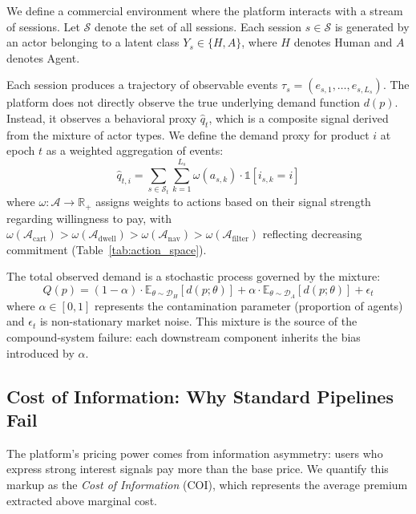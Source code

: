 \documentclass[sigconf]{acmart}
\begin{document}
We define a commercial environment where the platform interacts with a stream of sessions. Let $\mathcal{S}$ denote the set of all sessions. Each session $s \in \mathcal{S}$ is generated by an actor belonging to a latent class $Y_s \in \{H, A\}$, where $H$ denotes Human and $A$ denotes Agent.

Each session produces a trajectory of observable events $\tau_s = (e_{s,1}, \ldots, e_{s,L_s})$. The platform does not directly observe the true underlying demand function $d(p)$. Instead, it observes a behavioral proxy $\hat{q}_t$, which is a composite signal derived from the mixture of actor types. We define the demand proxy for product $i$ at epoch $t$ as a weighted aggregation of events:
\begin{equation}
\label{eq:qhat}
\hat{q}_{t,i} = \sum_{s \in \mathcal{S}_t} \sum_{k=1}^{L_s} \omega(a_{s,k}) \cdot \mathbb{1}[i_{s,k} = i]
\end{equation}
where $\omega: \mathcal{A} \to \mathbb{R}_+$ assigns weights to actions based on their signal strength regarding willingness to pay, with $\omega(\mathcal{A}_{\text{cart}}) > \omega(\mathcal{A}_{\text{dwell}}) > \omega(\mathcal{A}_{\text{nav}}) > \omega(\mathcal{A}_{\text{filter}})$ reflecting decreasing commitment (Table~\ref{tab:action_space}).

The total observed demand is a stochastic process governed by the mixture:
\begin{equation}
\label{eq:mixture_demand}
Q(p) = (1-\alpha) \cdot \mathbb{E}_{\theta \sim \mathcal{D}_H}[d(p; \theta)] + \alpha \cdot \mathbb{E}_{\theta \sim \mathcal{D}_A}[d(p; \theta)] + \epsilon_t
\end{equation}
where $\alpha \in [0, 1]$ represents the contamination parameter (proportion of agents) and $\epsilon_t$ is non-stationary market noise. This mixture is the source of the compound-system failure: each downstream component inherits the bias introduced by $\alpha$.

\subsection{Cost of Information: Why Standard Pipelines Fail}

The platform's pricing power comes from information asymmetry: users who express strong interest signals pay more than the base price. We quantify this markup as the \textit{Cost of Information} (COI), which represents the average premium extracted above marginal cost.
\end{document}
